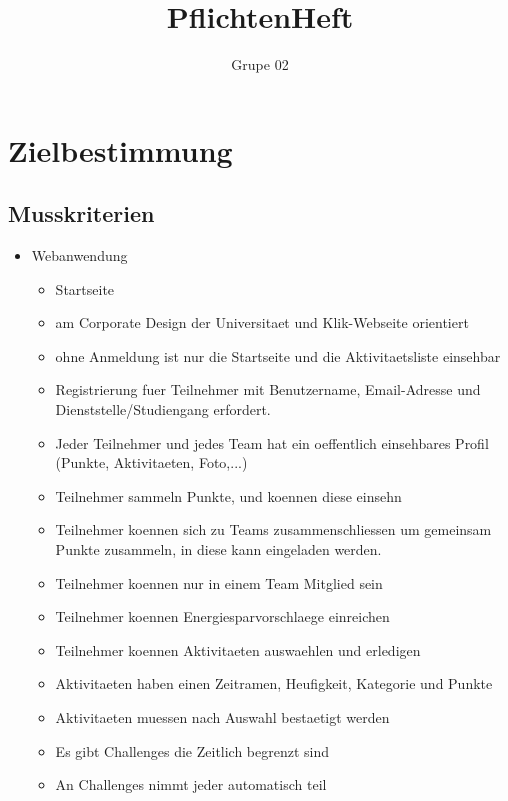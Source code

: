 \documentclass[10pt,a4paper]{article}
\author{Grupe 02}
\title{PflichtenHeft}
\begin{document}
\maketitle
\tableofcontents
\section{Zielbestimmung}
	\subsection{Musskriterien}
	\begin{itemize}
		\item Webanwendung
		\begin{itemize}
			\item Startseite
			\item am Corporate Design der Universitaet und Klik-Webseite orientiert
			\item ohne Anmeldung ist nur die Startseite und die Aktivitaetsliste einsehbar
			\item Registrierung fuer Teilnehmer mit Benutzername, Email-Adresse und Dienststelle/Studiengang erfordert.
			\item Jeder Teilnehmer und jedes Team hat ein oeffentlich einsehbares Profil (Punkte, Aktivitaeten, Foto,...) %
			\item Teilnehmer sammeln Punkte, und koennen diese einsehn
			\item Teilnehmer koennen sich zu Teams zusammenschliessen um gemeinsam Punkte zusammeln, in diese kann eingeladen werden.
			\item Teilnehmer koennen nur in einem Team Mitglied sein
			\item Teilnehmer koennen Energiesparvorschlaege einreichen
			\item Teilnehmer koennen Aktivitaeten auswaehlen und erledigen
			\item Aktivitaeten haben einen Zeitramen, Heufigkeit, Kategorie und Punkte
			\item Aktivitaeten muessen nach Auswahl bestaetigt werden
			\item Es gibt Challenges die Zeitlich begrenzt sind
			\item An Challenges nimmt jeder automatisch teil
			

\end{itemize}
\end{itemize}
\end{document}
